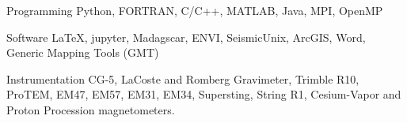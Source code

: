 

\begin{cvskills}

  \cvskill
    {Programming} %
    {Python, FORTRAN, C/C++, MATLAB, Java, MPI, OpenMP} %
    

    \cvskill
    {Software}
    { LaTeX, jupyter, Madagscar, ENVI, SeismicUnix, ArcGIS, Word, Generic Mapping Tools (GMT)}

  \cvskill
    {Instrumentation} %
    {CG-5, LaCoste and Romberg Gravimeter, Trimble R10, ProTEM, EM47, EM57, EM31, EM34, Supersting, String R1, Cesium-Vapor and Proton Procession magnetometers.} %

\end{cvskills}
